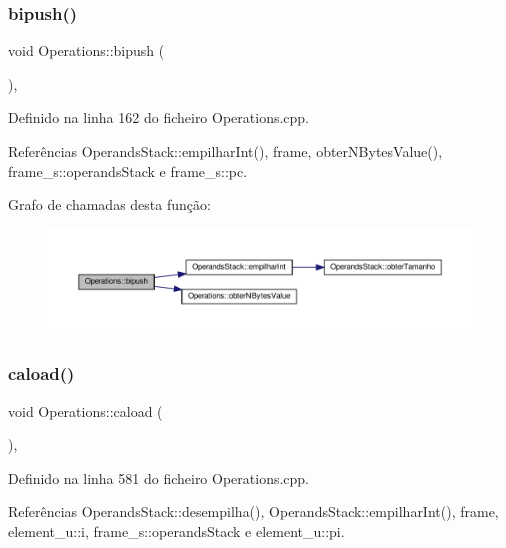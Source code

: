 \subsubsection{\texorpdfstring{bipush()}{bipush()}}
{\footnotesize\ttfamily void Operations\+::bipush (\begin{DoxyParamCaption}{ }\end{DoxyParamCaption})\hspace{0.3cm}{\ttfamily [static]}, {\ttfamily [private]}}



Definido na linha 162 do ficheiro Operations.\+cpp.



Referências Operands\+Stack\+::empilhar\+Int(), frame, obter\+N\+Bytes\+Value(), frame\+\_\+s\+::operands\+Stack e frame\+\_\+s\+::pc.

Grafo de chamadas desta função\+:\nopagebreak
\begin{figure}[H]
\begin{center}
\leavevmode
\includegraphics[width=350pt]{classOperations_a981b0f43cbe76b4fe7e2122c482d4a5b_cgraph}
\end{center}
\end{figure}
\mbox{\label{classOperations_a4bb55ffc2ba79a76a019a0c02d29d7f9}} 
\subsubsection{\texorpdfstring{caload()}{caload()}}
{\footnotesize\ttfamily void Operations\+::caload (\begin{DoxyParamCaption}{ }\end{DoxyParamCaption})\hspace{0.3cm}{\ttfamily [static]}, {\ttfamily [private]}}



Definido na linha 581 do ficheiro Operations.\+cpp.



Referências Operands\+Stack\+::desempilha(), Operands\+Stack\+::empilhar\+Int(), frame, element\+\_\+u\+::i, frame\+\_\+s\+::operands\+Stack e element\+\_\+u\+::pi.

